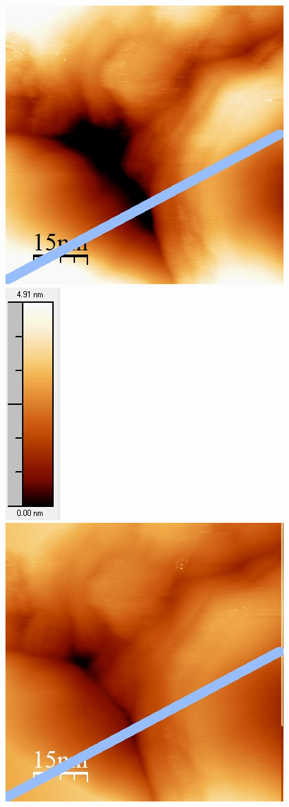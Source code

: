 \documentclass[12pt,a4paper]{article}
\begin{document}
\begin{figure}
\centering
\includegraphics[scale=0.6]{Bilder/Anhang/Zeit/2_Zeit_vor.jpg}
\includegraphics[scale=0.6]{Bilder/Anhang/Zeit/2_Zeit_vor_Skala.jpg}
\includegraphics[scale=0.6]{Bilder/Anhang/Zeit/2_Zeit_nach.jpg}

\end{figure}
\end{document}
